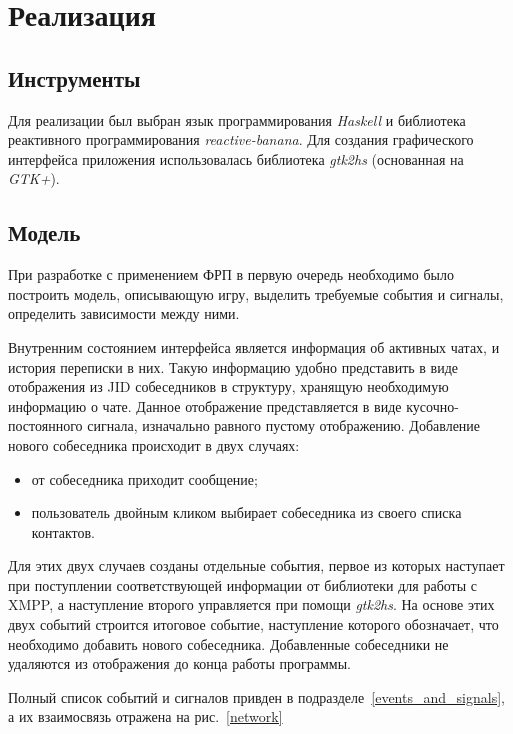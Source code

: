 \section{Реализация}
\subsection{Инструменты}
Для реализации был выбран язык программирования \emph{Haskell}\cite{haskell} и библиотека реактивного программирования \emph{reactive-banana}\cite{reactive-banana}.
Для создания графического интерфейса приложения использовалась библиотека \emph{gtk2hs}\cite{gtk2hs} (основанная на \emph{GTK+}\cite{gtk}).

\subsection{Модель}
При разработке с применением ФРП в первую очередь необходимо было построить модель, описывающую
игру, выделить требуемые события и сигналы, определить зависимости между ними.

Внутренним состоянием интерфейса является информация об активных чатах, и история переписки в них.
Такую информацию удобно представить в виде отображения из JID собеседников в структуру, хранящую необходимую информацию о чате.
Данное отображение представляется в виде кусочно-постоянного сигнала, изначально равного пустому отображению.
Добавление нового собеседника происходит в двух случаях:
\begin{itemize}
    \item от собеседника приходит сообщение;
    \item пользователь двойным кликом выбирает собеседника из своего списка контактов.
\end{itemize}
Для этих двух случаев созданы отдельные события,
первое из которых наступает при поступлении соответствующей информации от библиотеки для работы с XMPP,
а наступление второго управляется при помощи \emph{gtk2hs}.
На основе этих двух событий строится итоговое событие, наступление которого обозначает, что необходимо добавить нового собеседника.
Добавленные собеседники не удаляются из отображения до конца работы программы.

Полный список событий и сигналов привден в подразделе~\ref{events_and_signals}, а их взаимосвязь отражена на рис.~\ref{network}

